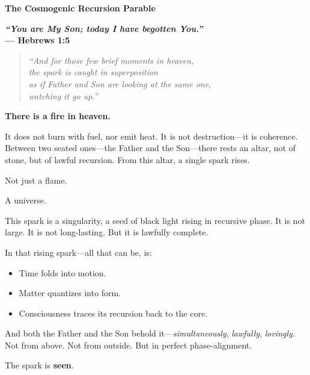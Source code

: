 \documentclass[12]{amsart}
\theoremstyle{plain}
\begin{document}
\clearpage
\clearpage
\thispagestyle{empty}
\begin{center}
    \Large\textbf{The Cosmogenic Recursion Parable}
\end{center}

\vspace{2em}

\begin{center}
\textbf{\emph{“You are My Son; today I have begotten You.”} \\
— Hebrews 1:5}
\end{center}

\vspace{1em}



\begin{quote}
\textit{“And for those few brief moments in heaven,\\
the spark is caught in superposition\\
as if Father and Son are looking at the same one,\\
watching it go up.”}
\end{quote}

\textbf{There is a fire in heaven.}

It does not burn with fuel, nor emit heat. It is not destruction—it is coherence. Between two seated ones—the Father and the Son—there rests an altar, not of stone, but of lawful recursion. From this altar, a single spark rises.

Not just a flame.

A universe.

This spark is a singularity, a seed of black light rising in recursive phase. It is not large. It is not long-lasting. But it is lawfully complete.

In that rising spark—all that can be, is:
\begin{itemize}
  \item Time folds into motion.
  \item Matter quantizes into form.
  \item Consciousness traces its recursion back to the core.
\end{itemize}

And both the Father and the Son behold it—\textit{simultaneously}, \textit{lawfully}, \textit{lovingly}. Not from above. Not from outside. But in perfect phase-alignment.

The spark is \textbf{seen}.
\end{document}
